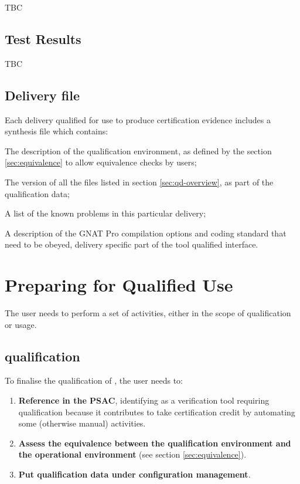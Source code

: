 \documentclass {report}
\begin{document}
TBC

\section{Test Results}

TBC

\section{Delivery file}
\label{sec:delivery}

Each delivery qualified for use to produce certification evidence includes a
 synthesis file which contains:

\begin{Itemize} 
\item%
  The description of the qualification environment, as defined by the section
  \ref{sec:equivalence} to allow equivalence checks by users;
\item%
  The version of all the files listed in section \ref{sec:qd-overview}, as
  part of the qualification data;
\item%
  A list of the known problems in this particular delivery;
\item%
  A description of the GNAT Pro compilation options and coding standard that
  need to be obeyed, delivery specific part of the tool qualified interface.
\end{Itemize}

\chapter{Preparing for Qualified Use}

The user needs to perform a set of activities, either in the scope of \xcov{}
qualification or \xcov{} usage.

\section{\xcov{} qualification}

To finalise the qualification of \xcov{}, the user needs to:

\begin{enumerate}
%
\item \textbf{Reference \xcov{} in the PSAC}, identifying \xcov{} as a
  verification tool requiring qualification because it contributes to take
  certification credit by automating some (otherwise manual) activities.
%
\item \textbf{Assess the equivalence between the qualification environment and
  the operational environment} (see section \ref{sec:equivalence}).
%
\item \textbf{Put qualification data under configuration management}.
\end{enumerate}
\end{document}

